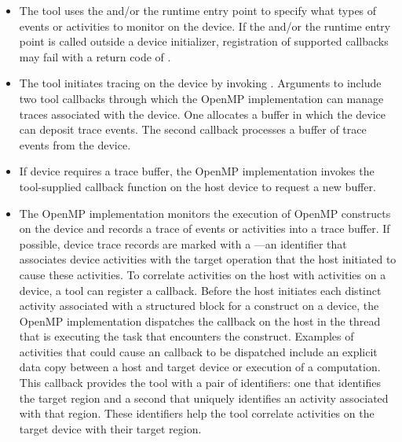 \begin{itemize}
\begin{table}
\end{table}

\item The tool uses the  and/or the 
       runtime entry point to specify what
      types of events or activities to monitor on the device. If the 
       and/or the  
      runtime entry point is called outside a device initializer, 
      registration of supported callbacks may fail with a return code of
      .
\item The tool initiates tracing on the device by invoking . 
      Arguments to  include two tool callbacks through which
      the OpenMP implementation can manage traces associated with the device. One 
      allocates a buffer in which the device can deposit trace events. The second 
      callback processes a buffer of trace events from the device.
\item If device requires a trace buffer, the OpenMP implementation invokes the 
      tool-supplied callback function on the host device to request a new buffer.
\item The OpenMP implementation monitors the execution of OpenMP constructs on the 
      device and records a trace of events or activities into a trace buffer. If 
      possible, device trace records are marked with a ---an 
      identifier that associates device activities with the target operation that
      the host initiated to cause these activities. To correlate activities on the 
      host with activities on a device, a tool can register a 
       callback. Before the host initiates each 
      distinct activity associated with a structured block for a  
      construct on a device, the OpenMP implementation dispatches the 
       callback on the host in the thread that
      is executing the task that encounters the  construct. 
      Examples of activities that could cause an  
      callback to be dispatched include an explicit data copy between a host 
      and target device or execution of a computation. This callback provides 
      the tool with a pair of identifiers: one that identifies the target 
      region and a second that uniquely identifies an activity associated 
      with that region. These identifiers help the tool correlate activities 
      on the target device with their target region.

\end{itemize}
